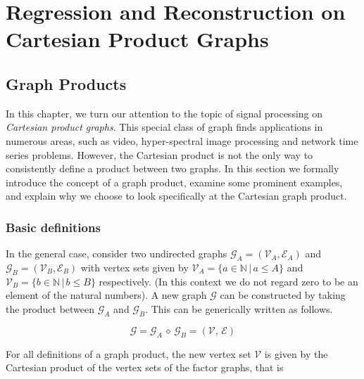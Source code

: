 \chapter{Regression and Reconstruction on Cartesian Product Graphs} 

\label{chap:reg_and_rec} 



 
\section{Graph Products}

\label{sec:reg_and_rec_intro}

In this chapter, we turn our attention to the topic of signal processing on \textit{Cartesian product graphs}. This special class of graph finds applications in numerous areas, such as video, hyper-spectral image processing and network time series problems. However, the Cartesian product is not the only way to consistently define a product between two graphs. In this section we formally introduce the concept of a graph product, examine  some prominent examples, and explain why we choose to look specifically at the Cartesian graph product. 

\subsection{Basic definitions}

In the general case, consider two undirected graphs $\mathcal{G}_A = (\mathcal{V}_A, \mathcal{E}_A)$ and $\mathcal{G}_B = (\mathcal{V}_B, \mathcal{E}_B)$ with vertex sets given by $\mathcal{V}_A = \{a \in \mathbb{N} \, | \, a \leq A \}$ and $\mathcal{V}_B = \{b \in \mathbb{N} \, | \, b \leq B \}$ respectively. (In this context we do not regard zero to be an element of the natural numbers). A new graph $\mathcal{G}$ can be constructed by taking the product between $\mathcal{G}_A$ and $\mathcal{G}_B$. This can be generically written as follows. 

\begin{equation}
    \mathcal{G} = \mathcal{G}_A \, \diamond \, \mathcal{G}_B = (\mathcal{V}, \, \mathcal{E})
\end{equation}

For all definitions of a graph product, the new vertex set $\mathcal{V}$ is given by the Cartesian product of the vertex sets of the factor graphs, that is
 
